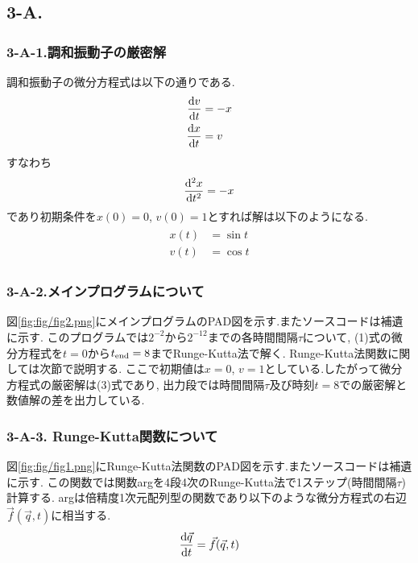 \subsection*{3-A.}
\subsubsection*{3-A-1.調和振動子の厳密解}
調和振動子の微分方程式は以下の通りである.
\begin{align}
  \begin{split}
    \frac{{\rm d}v}{{\rm d}t}&=-x\\
    \frac{{\rm d}x}{{\rm d}t}&=v
  \end{split}
\end{align}
すなわち
\begin{align}
  \frac{{\rm d}^2x}{{\rm d}t^2}=-x
\end{align}
であり初期条件を$x(0)=0$, $v(0)=1$とすれば解は以下のようになる.
\begin{align}
  \begin{split}
    x(t)&=\sin t\\
    v(t)&=\cos t
  \end{split}
\end{align}
\subsubsection*{3-A-2.メインプログラムについて}
図\ref{fig:fig/fig2.png}にメインプログラムのPAD図を示す.またソースコードは補遺に示す.
このプログラムでは$2^{-2}$から$2^{-12}$までの各時間間隔$\tau$について,
(1)式の微分方程式を$t=0$から$t_{\rm end}=8$までRunge-Kutta法で解く.
Runge-Kutta法関数に関しては次節で説明する.
ここで初期値は$x=0$, $v=1$としている.したがって微分方程式の厳密解は(3)式であり,
出力段では時間間隔$\tau$及び時刻$t=8$での厳密解と数値解の差を出力している.
\subsubsection*{3-A-3. Runge-Kutta関数について}
図\ref{fig:fig/fig1.png}にRunge-Kutta法関数のPAD図を示す.またソースコードは補遺に示す.
この関数では関数argを4段4次のRunge-Kutta法で1ステップ(時間間隔$\tau$)計算する.
argは倍精度1次元配列型の関数であり以下のような微分方程式の右辺$\vec{f}(\vec{q},t)$に相当する.
\begin{align}
  \frac{{\rm d}\vec{q}}{{\rm d}t}=\vec{f}(\vec{q},t)
\end{align}
